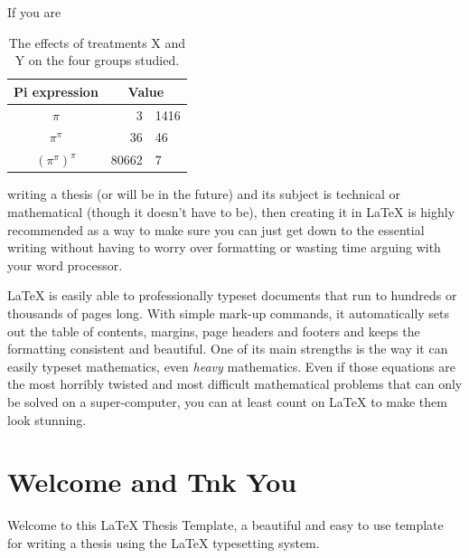 If you are
\begin{table}

    \label{tab:treatments}
    \centering
    \begin{tabular}{c r @{.} l}
        Pi expression       &
        \multicolumn{2}{c}{Value} \\
        \hline
        $\pi$               & 3&1416  \\
        $\pi^{\pi}$         & 36&46   \\
        $(\pi^{\pi})^{\pi}$ & 80662&7 \\
    \end{tabular}
    \caption{The effects of treatments X and Y on the four groups studied.}
\end{table}
writing a thesis (or will be in the future) and its subject is technical or mathematical (though it doesn't have to be), then creating it in \LaTeX{} is highly recommended as a way to make sure you can just get down to the essential writing without having to worry over formatting or wasting time arguing with your word processor.

\LaTeX{} is easily able to professionally typeset documents that run to hundreds or thousands of pages long. With simple mark-up commands, it automatically sets out the table of contents, margins, page headers and footers and keeps the formatting consistent and beautiful. One of its main strengths is the way it can easily typeset mathematics, even \emph{heavy} mathematics. Even if those equations are the most horribly twisted and most difficult mathematical problems that can only be solved on a super-computer, you can at least count on \LaTeX{} to make them look stunning.


\section{Welcome and Tnk You}\label{sec:wlcome}
Welcome to this \LaTeX{} Thesis Template, a beautiful and easy to use template for writing a thesis using the \LaTeX{} typesetting system.

